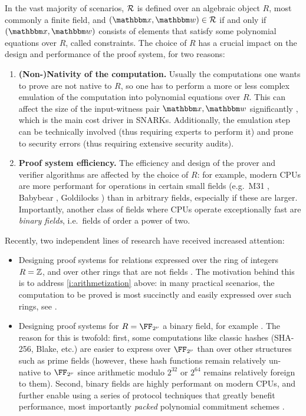 In the vast majority of scenarios, $\mathcal{R}$ is defined over an algebraic object $R$, most commonly a finite field, and $(\inp,\wit)\in \Relation$ if and only if $(\inp,\wit)$ consists of elements that satisfy some polynomial equations over $R$, called  constraints. The choice of $R$ has a crucial impact on the design and  performance of the proof system, for two reasons: 
\begin{enumerate}[leftmargin=*]
\item
\label{i:arithmetization}
\textbf{(Non-)Nativity of the computation.} Usually the computations one wants to prove are not native to $R$, so one has to perform a more or less complex emulation of the computation into polynomial equations over $R$. This can affect the size of the input-witness pair $\inp,\wit$ significantly \cite{xJsnark,jea_codes,EFpaper,zinc,binius}, which is the main cost driver in SNARKs. Additionally, the emulation step can be technically involved (thus requiring experts to perform it) and prone to  security errors \cite{snark-vuln-sok,zk-circuit-bugs,Edi23,Zkb} (thus requiring extensive security audits).  
\item
\label{i:field:performance}
\textbf{Proof system efficiency.} The efficiency and design of the prover and verifier algorithms are affected by the choice of $R$: for example, modern CPUs are more performant for operations in certain small fields (e.g.\ M31 \cite{cryptoeprint:2023/824,CircleSTARKs}, Babybear \cite{risczero}, Goldilocks \cite{plonky2:repo}) than in arbitrary fields, especially if these are larger. Importantly, another class of fields where CPUs operate exceptionally fast are \emph{binary fields}, i.e.\ fields of order a power of two.
%
\end{enumerate}
\noindent Recently, two independent lines of research have received increased attention:
\begin{itemize}[leftmargin=*]
    \item Designing proof systems for relations expressed over  the ring of integers $R=\mathbb{Z}$, and over other rings that are not fields \cite{zaratan,zinc,zincplus,qaren,limber,rinnochio,soria2022doubly,baum2022moz,new_rings_work_one,new_rings_work_two}. The motivation behind this is to address \cref{i:arithmetization} above: in many practical scenarios, the computation to be proved is most succinctly and easily expressed over such rings, see \cite{zinc,zincplus,limber}. 
    \item Designing proof systems for $R=\comfield$ a binary field, for example \cite{stark,cryptoeprint:2022/1542,binius2,hashcaster:repo,flock}. The reason for this is twofold: first, some computations like classic hashes (SHA-256, Blake, etc.) are easier to express over  $\comfield$ than over other structures such as prime fields (however, these hash functions remain relatively un-native to  $\comfield$ since arithmetic modulo $2^{32}$ or $2^{64}$ remains relatively foreign to them). Second, binary fields are highly performant on modern CPUs, and further enable using a series of protocol techniques that greatly benefit performance, most importantly \textit{packed} polynomial commitment schemes \cite{binius,binius2}. 
\end{itemize}


